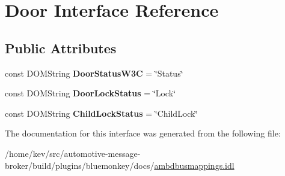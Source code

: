 \hypertarget{interfaceDoor}{\section{Door Interface Reference}
\label{interfaceDoor}
}
\subsection*{Public Attributes}
\begin{DoxyCompactItemize}
\item 
\hypertarget{interfaceDoor_a4af5af6f4efc20234ce3f257bc5a3347}{const D\+O\+M\+String {\bfseries Door\+Status\+W3\+C} = \char`\"{}Status\char`\"{}}\label{interfaceDoor_a4af5af6f4efc20234ce3f257bc5a3347}

\item 
\hypertarget{interfaceDoor_ae84bb265834617dc8dd0d46c98b7974a}{const D\+O\+M\+String {\bfseries Door\+Lock\+Status} = \char`\"{}Lock\char`\"{}}\label{interfaceDoor_ae84bb265834617dc8dd0d46c98b7974a}

\item 
\hypertarget{interfaceDoor_aef0d00bd271c3643df33b347ab163b1e}{const D\+O\+M\+String {\bfseries Child\+Lock\+Status} = \char`\"{}Child\+Lock\char`\"{}}\label{interfaceDoor_aef0d00bd271c3643df33b347ab163b1e}

\end{DoxyCompactItemize}


The documentation for this interface was generated from the following file\+:\begin{DoxyCompactItemize}
\item 
/home/kev/src/automotive-\/message-\/broker/build/plugins/bluemonkey/docs/\hyperlink{ambdbusmappings_8idl}{ambdbusmappings.\+idl}\end{DoxyCompactItemize}
